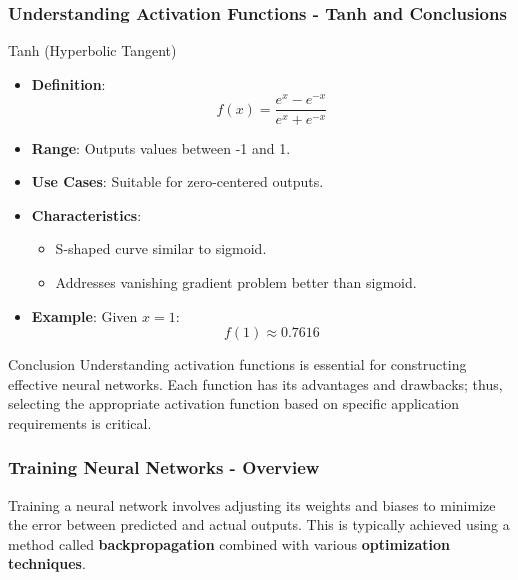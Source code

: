\documentclass[aspectratio=169]{beamer}
\begin{document}
\begin{frame}[fragile]
    \frametitle{Understanding Activation Functions - Tanh and Conclusions}
    \begin{block}{Tanh (Hyperbolic Tangent)}
        \begin{itemize}
            \item \textbf{Definition}:
            \[
            f(x) = \frac{e^x - e^{-x}}{e^x + e^{-x}}
            \]
            \item \textbf{Range}: Outputs values between -1 and 1.
            \item \textbf{Use Cases}: Suitable for zero-centered outputs.
            \item \textbf{Characteristics}:
                \begin{itemize}
                    \item S-shaped curve similar to sigmoid.
                    \item Addresses vanishing gradient problem better than sigmoid.
                \end{itemize}
            \item \textbf{Example}: Given \( x = 1 \):
            \[
            f(1) \approx 0.7616
            \]
        \end{itemize}
    \end{block}
    
    \begin{block}{Conclusion}
        Understanding activation functions is essential for constructing effective neural networks. Each function has its advantages and drawbacks; thus, selecting the appropriate activation function based on specific application requirements is critical.
    \end{block}
\end{frame}

\begin{frame}[fragile]
    \frametitle{Training Neural Networks - Overview}
    Training a neural network involves adjusting its weights and biases to minimize the error between predicted and actual outputs. This is typically achieved using a method called \textbf{backpropagation} combined with various \textbf{optimization techniques}.
\end{frame}
\end{document}
